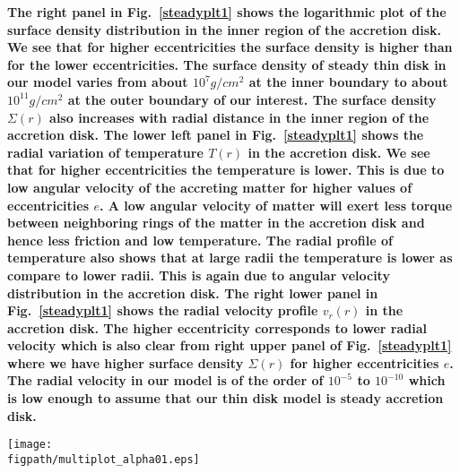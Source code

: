 \documentclass[useAMS,usenatbib]{mn2e}
\newcommand{\figpath}{./Figs/}
\begin{document}
\textbf{The right panel in Fig.~\ref{steadyplt1} shows the logarithmic plot of the surface density distribution in the inner region of the accretion disk. We see that for higher eccentricities the surface density is higher than for the lower eccentricities. The surface density of steady thin disk in our model varies from about $10^7g/cm^2$ at the inner boundary to about $10^11 g/cm^2$ at the outer boundary of our interest. The surface density $\Sigma (r)$ also increases with radial distance in the inner region of the accretion disk. The lower left panel in Fig.~\ref{steadyplt1} shows the radial variation of temperature $T(r)$ in the accretion disk. We see that for higher eccentricities the temperature is lower. This is due to low angular velocity of the accreting matter for higher values of eccentricities $e$. A low angular velocity of matter will exert less torque between neighboring rings of the matter in the accretion disk and hence less friction and low temperature. The radial profile of temperature also shows that at large radii the temperature is lower as compare to lower radii. This is again due to angular velocity distribution in the accretion disk. The right lower panel in Fig.~\ref{steadyplt1} shows the radial velocity profile $v_r(r)$ in the accretion disk. The higher eccentricity corresponds to lower radial velocity which is also clear from right upper panel of Fig.~\ref{steadyplt1} where we have higher surface density $\Sigma(r)$ for higher eccentricities $e$. The radial velocity in our model is of the order of $10^{-5}$ to $10^{-10}$ which is low enough to assume that our thin disk model is steady accretion disk.}

\begin{figure*}
\centering
\texttt{[image: \\figpath/multiplot\_alpha01.eps]}
\caption{Multiplot of height $z_0(r)$, surface density $\Sigma(r)$, temperature $T(r)$ and radial velocity $v_r(r)$ variation with radial distance from the center of the star}
\label{steadyplt1}
\end{figure*}
\end{document}
